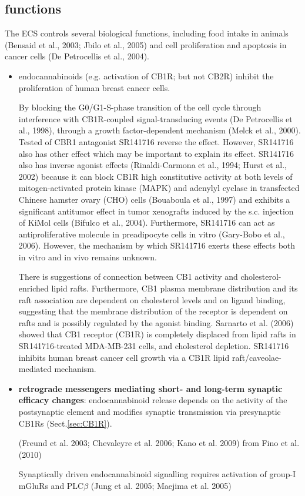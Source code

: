 \subsection{functions}

The ECS controls several biological functions, including food intake in animals
(Bensaid et al., 2003; Jbilo et al., 2005) and cell proliferation and apoptosis
in cancer cells (De Petrocellis et al., 2004).

\begin{itemize}
  \item  endocannabinoids (e.g. activation of CB1R; but not CB2R) inhibit the
  proliferation of human breast cancer cells.

By blocking the G0/G1-S-phase transition of the cell cycle through interference
with CB1R-coupled signal-transducing events (De Petrocellis et al., 1998),
through a growth factor-dependent mechanism (Melck et al., 2000).
Tested of CBR1 antagonist SR141716 reverse the effect. However, SR141716 also
has other effect which may be important to explain its effect.
SR141716 also has inverse agonist effects (Rinaldi-Carmona
et al., 1994; Hurst et al., 2002) because it can block CB1R
high constitutive activity at both levels of mitogen-activated
protein kinase (MAPK) and adenylyl cyclase in transfected
Chinese hamster ovary (CHO) cells (Bouaboula et al., 1997)
and exhibits a significant antitumor effect in tumor xenografts
induced by the s.c. injection of KiMol cells (Bifulco et
al., 2004). Furthermore, SR141716 can act as antiproliferative
molecule in preadipocyte cells in vitro (Gary-Bobo et al.,
2006). However, the mechanism by which SR141716 exerts
these effects both in vitro and in vivo remains unknown.


There is suggestions of connection between CB1 activity and cholesterol-enriched
lipid rafts.  Furthermore, CB1 plasma membrane distribution and its raft
association are dependent on cholesterol levels and on ligand binding,
suggesting that the membrane distribution of the receptor is
dependent on rafts and is possibly regulated by the agonist
binding. Sarnarto et al. (2006) showed that 
CB1 receptor (CB1R) is completely displaced from lipid rafts in
SR141716-treated MDA-MB-231 cells, and cholesterol depletion.
SR141716 inhibits human breast cancer cell growth via a CB1R
lipid raft/caveolae-mediated mechanism.
  
  \item {\bf retrograde messengers mediating short- and long-term synaptic
  efficacy changes}: endocannabinoid release depends
on the activity of the postsynaptic element and modifies synaptic transmission
via presynaptic CB1Rs (Sect.\ref{sec:CB1R}).
  
(Freund et al. 2003; Chevaleyre et al.
2006; Kano et al. 2009)  from Fino et al. (2010)


Synaptically driven endocannabinoid signalling requires activation of group-I
mGluRs and PLC$\beta$ (Jung et al. 2005; Maejima et al. 2005)



\end{itemize}

